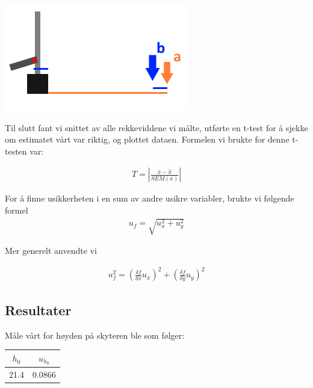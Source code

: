 \bigskip \hfil
\includegraphics[scale = 0.5]{Figurer/ProsjektilDiagram.png} 
\label{ProjDiagram}
\par \bigskip

Til slutt fant vi snittet av alle rekkeviddene vi målte, utførte en t-test for å sjekke om estimatet vårt var riktig, og plottet dataen. Formelen vi brukte for denne t-testen var:

\begin{align}
    T = \left|\frac{\overline{x} - \hat{x}}{SEM(x)}\right|\label{ttest2}
\end{align}

For å finne usikkerheten i en sum av andre usikre variabler, brukte vi følgende formel
\begin{align}
    u_f = \sqrt{u_x^2 +u_y^2}\label{au3}
\end{align}

Mer generelt anvendte vi 

\begin{align}
    u_f^2 = \left(\frac{\delta f}{\delta x} u_x\right)^2 + \left(\frac{\delta f}{\delta y} u_y\right)^2\label{gu2}
\end{align}

\subsection{Resultater}

Måle vårt for høyden på skyteren ble som følger:

\begin{center}
\begin{tabular}{ | c | c | }
    \hline
    $h_0$ & $u_{h_0}$ \\ 
    \hline
    21.4 & 0.0866\\ 
    \hline
\end{tabular}
\end{center}

